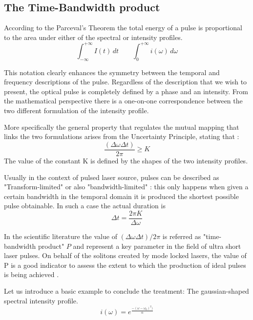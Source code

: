 \subsection{The Time-Bandwidth product}
According to the Parceval's Theorem the total energy of a pulse is proportional to the area under either of the spectral or intensity profiles.
\begin{equation}
    \int_{-\infty}^{+\infty} I(t)\, dt \quad \quad  \int_{0}^{+\infty} i(\omega)\, d\omega
\label{eq:AreaIntensities}
\end{equation}

This notation clearly enhances the symmetry between the temporal and frequency descriptions of the pulse.
Regardless of the description that we wish to present, the optical pulse is completely defined by a phase and an intensity. From the mathematical perspective there is a one-on-one correspondence between the two different formulation of the intensity profile.

More specifically the general property that regulates the mutual mapping that links the two formulations arises from the Uncertainty Principle, stating that : 
\begin{equation}
    \frac{(\Delta \omega \Delta t)}{2\pi} \ge K
\label{eq:Uncertainty}
\end{equation}
The value of the constant K is defined by the shapes of the two intensity profiles.

Usually in the context of pulsed laser source, pulses can be described as "Transform-limited" or also "bandwidth-limited" : this only happens when given a certain bandwidth in the temporal domain it is produced the shortest possible pulse obtainable.
In such a case the actual duration is 
\begin{equation}
    \Delta t = \frac{2\pi K}{\Delta \omega}
\label{eq:TransLimited}
\end{equation}

In the scientific literature the value of $(\Delta \omega \Delta t)/2\pi$ is referred as "time-bandwidth product" $P$ and represent a key parameter in the field of ultra short laser pulses. On behalf of the solitons created by mode locked lasers, the value of P is a good indicator to assess the extent to which the production of ideal pulses is being achieved \cite{shapiro1984}.

Let us introduce a basic example to conclude the treatment: The gaussian-shaped spectral intensity profile.
\begin{equation}
    i(\omega) = e^{\frac{-(\omega - \omega _0 )^2)}{\alpha}}
\label{eq:exampleSpectral}
\end{equation}

